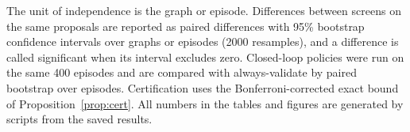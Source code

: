 The unit of independence is the graph or episode. Differences between screens on the same proposals are reported
as paired differences with 95\% bootstrap confidence intervals over graphs or episodes (2000 resamples), and a
difference is called significant when its interval excludes zero. Closed-loop policies were run on the same 400
episodes and are compared with always-validate by paired bootstrap over episodes. Certification uses the
Bonferroni-corrected exact bound of Proposition~\ref{prop:cert}. All numbers in the tables and figures are
generated by scripts from the saved results.

